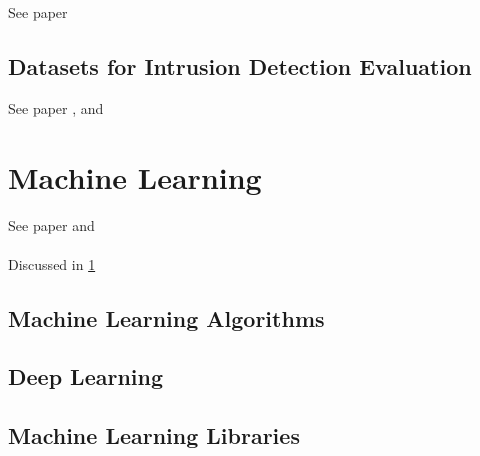 See paper \cite{Liu2019}


\subsection{Datasets for Intrusion Detection Evaluation}
\label{subsec:datasets-for-evaluation}

See paper \cite{icissp18}, \cite{Khraisat2019} and \cite{Leevy2020} \\

\lipsum[1-6]


\section{Machine Learning}
\label{sec:machine-learning}

See paper \cite{Khraisat2019} and \cite{Hodo2017} \\

\lipsum \\
Discussed in \ref{sec:machine-learning}


\subsection{Machine Learning Algorithms}
\label{subsec:ml-algorithms}

\lipsum


\subsection{Deep Learning}
\label{subsec:deep-learning}

\lipsum


\subsection{Machine Learning Libraries}
\label{subsec:ml-libraries}

\lipsum